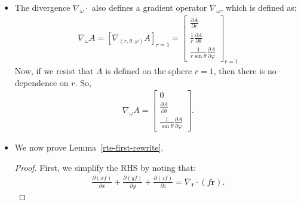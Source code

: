 \documentclass[10pt]{article}
\newcommand{\ve}[1]{\mathbf{#1}}
\begin{document}
\begin{itemize}
    \item The divergence $\nabla_\omega \cdot$ also defines a gradient operator $\nabla_\omega$, which is defined as:
    \begin{align*}
      \nabla_\omega A 
      = [\nabla_{(r,\theta,\varphi)} A]_{r = 1}
      = \begin{bmatrix}
        \frac{\partial A}{\partial r} \\
        \frac{1}{r} \frac{\partial A}{\partial \theta} \\
        \frac{1}{r\sin\theta} \frac{\partial A}{\partial \varphi}
      \end{bmatrix}_{r=1}
    \end{align*}
    Now, if we resist that $A$ is defined on the sphere $r = 1$, then there is no dependence on $r$. So,
    \begin{align*}
      \nabla_\omega A       
      = \begin{bmatrix}
        0 \\
        \frac{\partial A}{\partial \theta} \\
        \frac{1}{\sin\theta}\frac{\partial A}{\partial \varphi}
      \end{bmatrix}.
    \end{align*}

    \item We now prove Lemma~\ref{rte-first-rewrite}.
    \begin{proof}
      First, we simplify the RHS by noting that:
      \begin{align*}
        \frac{\partial (\dot x f)}{\partial x}
        + \frac{\partial (\dot y f)}{\partial y}
        + \frac{\partial (\dot z f)}{\partial z}
        = \nabla_{\ve{r}} \cdot (f \dot{\ve{r}}).
      \end{align*}


\end{proof}
\end{itemize}
\end{document}
